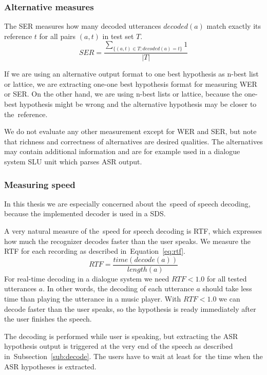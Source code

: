 {\subsubsection*{Alternative measures}
The \acl{SER} measures how many decoded utterances $decoded(a)$ match exactly its reference $t$
for all pairs $(a, t)$ in test set $T$.
\begin{equation}
    SER = \frac{\sum_{\{(a, t) \in T; decoded(a) = t\}}{1}}{|T|}
\end{equation}

If we are using an alternative output format to one best hypothesis as n-best list or lattice, we are extracting one-one best hypothesis format for measuring \ac{WER} or \ac{SER}.
On the other hand, we are using n-best lists or lattice, because the one-best hypothesis might be wrong and the alternative hypothesis may be closer to the~reference.

We do not evaluate any other measurement except for \ac{WER} and \ac{SER}, but note that richness and correctness of alternatives are desired qualities.
The alternatives may contain additional information and are for example used in a dialogue system \acl{SLU} unit which parses \ac{ASR} output.

\subsubsection*{Measuring speed}
\label{sub:the_metrics_in_speech_recognition}
In this thesis we are especially concerned about the~speed of speech decoding, because the implemented decoder is used in a \acl{SDS}.

A very natural measure of the~speed for speech decoding is \acl{RTF}, which expresses how much the recognizer decodes faster than the user speaks.
We measure the \ac{RTF} for each recording as described in~Equation~\ref{eq:rtf}.
\begin{equation}\label{eq:rtf}
    RTF = \frac{time(decode(a))}{length(a)}
\end{equation}
For real-time decoding in a dialogue system we need $RTF < 1.0$ for all tested utterances $a$.
In other words, the decoding of each utterance $a$ should take less time than playing the utterance in a music player.
With $RTF < 1.0$ we can decode faster than the user speaks, so the hypothesis is ready immediately after the user finishes the speech. 

The decoding is performed while user is speaking, but extracting the \ac{ASR} hypothesis output is triggered at the very end of the speech as described in~Subsection~\ref{sub:decode}.
The users have to wait at least for~the time when the \ac{ASR} hypotheses is extracted.

}
